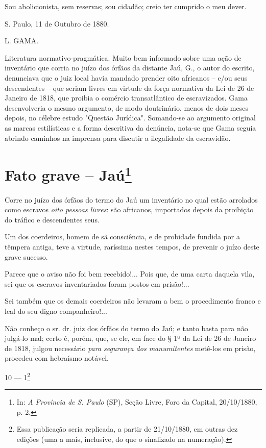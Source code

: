 Sou abolicionista, sem reservas; sou cidadão; creio ter cumprido o meu
dever.

S. Paulo, 11 de Outubro de 1880.

L. GAMA.

\pagebreak
\mbox{}\vfill
\thispagestyle{empty}

{\small\noindent
Literatura normativo-pragmática. Muito bem informado sobre uma
ação de inventário que corria no juízo dos órfãos da distante Jaú, G., o
autor do escrito, denunciava que o juiz local havia mandado prender oito
africanos -- e/ou seus descendentes -- que seriam livres em virtude da
força normativa da Lei de 26 de Janeiro de 1818, que proibia o comércio
transatlântico de escravizados. Gama desenvolveria o mesmo argumento, de
modo doutrinário, menos de dois meses depois, no célebre estudo "Questão
Jurídica". Somando-se ao argumento original as marcas estilísticas e a
forma descritiva da denúncia, nota-se que Gama seguia abrindo caminhos
na imprensa para discutir a ilegalidade da escravidão. }

\chapter{Fato grave -- Jaú\footnote[*]{In: \emph{A Província
  de S. Paulo} (SP), Seção Livre, Foro da Capital, 20/10/1880, p. 2.}}

Corre no juízo dos órfãos do termo do Jaú um inventário no qual estão
arrolados como escravos \emph{oito pessoas livres}: são africanos,
importados depois da proibição do tráfico e descendentes seus.

Um dos coerdeiros, homem de sã consciência, e de probidade fundida por a
têmpera antiga, teve a virtude, raríssima nestes tempos, de prevenir o
juízo deste grave sucesso.

Parece que o aviso não foi bem recebido!... Pois que, de uma carta
daquela vila, sei que os escravos inventariados foram postos em
prisão!...

Sei também que os demais coerdeiros não levaram a bem o procedimento
franco e leal do seu digno companheiro!...

Não conheço o sr. dr. juiz dos órfãos do termo do Jaú; e tanto basta
para não julgá-lo mal; certo é, porém, que, se ele, em face do § 1º da
Lei de 26 de Janeiro de 1818, julgou necessário \emph{para segurança dos
manumitentes} metê-los em prisão, procedeu com hebraísmo notável.

10 --- 1\footnote{Essa publicação seria replicada, a partir de
  21/10/1880, em outras dez edições (uma a mais, inclusive, do que o
  sinalizado na numeração).}

